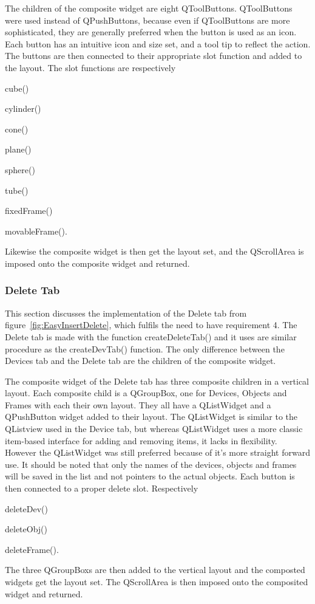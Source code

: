 The children of the composite widget are eight QToolButtons. QToolButtons were used instead of QPushButtons, because even if QToolButtons are more sophisticated, they are generally preferred when the button is used as an icon. Each button has an intuitive icon and size set, and a tool tip to reflect the action. The buttons are then connected to their appropriate slot function and added to the layout. The slot functions are respectively \begin{enumerate*}[font={\color{red!50!black}\bfseries}]
\item cube()
\item cylinder()
\item cone()
\item plane()
\item sphere()
\item tube()
\item fixedFrame()
\item movableFrame().
\end{enumerate*}    
Likewise the composite widget is then get the layout set, and the QScrollArea is imposed onto the composite widget and returned.

\subsubsection{Delete Tab}
\label{sec:DelTab}

This section discusses the implementation of the Delete tab from figure~\ref{fig:EasyInsertDelete}, which fulfils the need to have requirement 4. The Delete tab is made with the function createDeleteTab() and it uses are similar procedure as the createDevTab() function. The only difference between the Devices tab and the Delete tab are the children of the composite widget.

The composite widget of the Delete tab has three composite children in a vertical layout. Each composite child is a QGroupBox, one for Devices, Objects and Frames with each their own layout. They all have a QListWidget and a QPushButton widget added to their layout. The QListWidget is similar to the QListview used in the Device tab, but whereas QListWidget uses a more classic item-based interface for adding and removing items, it lacks in flexibility. However the QListWidget was still preferred because of it's more straight forward use. It should be noted that only the names of the devices, objects and frames will be saved in the list and not pointers to the actual objects. Each button is then connected to a proper delete slot. Respectively \begin{enumerate*}[font={\color{red!50!black}\bfseries}]
\item deleteDev()
\item deleteObj()
\item deleteFrame().
\end{enumerate*} 
The three QGroupBoxs are then added to the vertical layout and the composted widgets get the layout set. The QScrollArea is then imposed onto the composited widget and returned.

